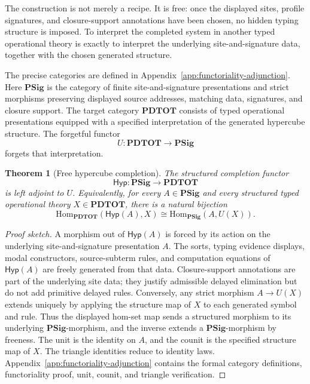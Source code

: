 \documentclass[11pt]{article}
\newcommand{\Hyp}{\mathsf{Hyp}}
\newtheorem{theorem}[definition]{Theorem}
\begin{document}
The construction is not merely a recipe.  It is free: once the displayed sites,
profile signatures, and closure-support annotations have been chosen, no hidden
typing structure is imposed.  To interpret the completed system in another typed
operational theory is exactly to interpret the underlying site-and-signature
data, together with the chosen generated structure.

The precise categories are defined in Appendix~\ref{app:functoriality-adjunction}.
Here \(\mathbf{PSig}\) is the category of finite site-and-signature
presentations and strict morphisms preserving displayed source addresses,
matching data, signatures, and closure support.  The target category
\(\mathbf{PDTOT}\) consists of typed operational presentations equipped with a
specified interpretation of the generated hypercube structure.  The forgetful
functor
\[
  U:\mathbf{PDTOT}\to\mathbf{PSig}
\]
forgets that interpretation.

\begin{theorem}[Free hypercube completion]
\label{thm:free-hyp}
The structured completion functor
\[
  \Hyp:\mathbf{PSig}\to\mathbf{PDTOT}
\]
is left adjoint to \(U\).  Equivalently, for every
\(A\in\mathbf{PSig}\) and every structured typed operational theory
\(X\in\mathbf{PDTOT}\), there is a natural bijection
\[
  \mathrm{Hom}_{\mathbf{PDTOT}}(\Hyp(A),X)
  \cong
  \mathrm{Hom}_{\mathbf{PSig}}(A,U(X)).
\]
\end{theorem}

\begin{proof}[Proof sketch]
A morphism out of \(\Hyp(A)\) is forced by its action on the underlying
site-and-signature presentation \(A\).  The sorts, typing evidence displays,
modal constructors, source-subterm rules, and computation equations of
\(\Hyp(A)\) are freely generated from that data.  Closure-support annotations are part of the underlying site data; they justify admissible delayed elimination but do not add primitive delayed rules.  Conversely, any strict
morphism \(A\to U(X)\) extends uniquely by applying the structure map of \(X\)
to each generated symbol and rule.  Thus the displayed hom-set map sends a
structured morphism to its underlying \(\mathbf{PSig}\)-morphism, and the inverse
extends a \(\mathbf{PSig}\)-morphism by freeness.  The unit is the identity on
\(A\), and the counit is the specified structure map of \(X\).  The triangle
identities reduce to identity laws.  Appendix~\ref{app:functoriality-adjunction}
contains the formal category definitions, functoriality proof, unit, counit, and
triangle verification.
\end{proof}
\end{document}

